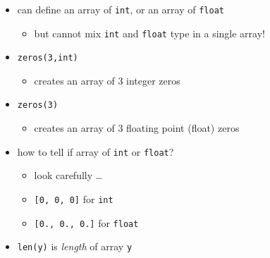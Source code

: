 \documentclass[english,14pt]{beamer}
\newcommand\red[1]{{\color{red} #1}}
\begin{document}

\begin{frame}[fragile]

\frametitle{}

\begin{itemize}

	\item can define an array of \texttt{int}, or an array of \texttt{float}
	\begin{itemize}
		\item but cannot mix \texttt{int} and \texttt{float} type in a single array!
	\end{itemize}

	\vspace*{2mm}

	\item \texttt{zeros(3,int)}
	
	\vspace*{2mm}
		
	\begin{itemize}
		\item creates an array of $3$ integer zeros
	\end{itemize}
	
	\vspace*{2mm}
		
	\item \texttt{zeros(3)}
	\begin{itemize}
		\item creates an array of $3$ floating point (float) zeros
	\end{itemize}
	
	\vspace*{2mm}
		
	\item how to tell if array of \texttt{int} or \texttt{float}?
	\begin{itemize}
		\item look carefully \ldots
		\item \texttt{[0, 0, 0]} for \texttt{int}
		\item \texttt{[0., 0., 0.]} for \texttt{float}
	\end{itemize}

	\vspace*{2mm}
	
	\item \texttt{len(y)} is \red{\emph{length}} of array \texttt{y}
\end{itemize}

\end{frame}
\end{document}
